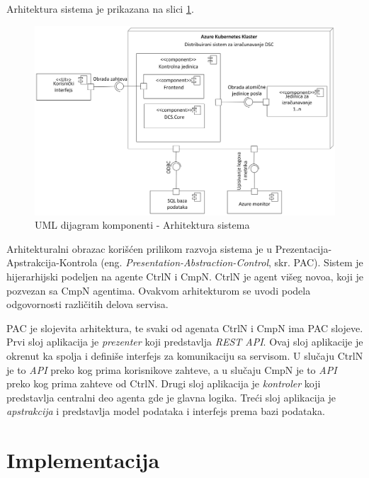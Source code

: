 \documentclass[12pt,oneside]{memoir}
\begin{document}
Arhitektura sistema je prikazana na slici \ref{fig:arhitektura}.

\begin{figure}[!ht]
  \centering
  \includegraphics[width=1.0\textwidth]{./images/arhitektura_sistema_dijagram_komponenti.png}
  \caption{UML dijagram komponenti - Arhitektura sistema}
  \label{fig:arhitektura}
\end{figure}

Arhitekturalni obrazac korišćen prilikom razvoja sistema je u Prezentacija-Apstrakcija-Kontrola (eng. \emph{Presentation-Abstraction-Control}, skr. PAC). Sistem je hijerarhijski podeljen na agente CtrlN i CmpN. CtrlN je agent višeg novoa, koji je pozvezan sa CmpN agentima. Ovakvom arhitekturom se uvodi podela odgovornosti različitih delova servisa.

PAC je slojevita arhitektura, te svaki od agenata CtrlN i CmpN ima PAC slojeve. Prvi sloj aplikacija je \emph{prezenter} koji predstavlja \emph{REST API}. Ovaj sloj aplikacije je okrenut ka spolja i definiše interfejs za komunikaciju sa servisom. U slučaju CtrlN je to \emph{API} preko kog prima korisnikove zahteve, a u slučaju CmpN je to \emph{API} preko kog prima zahteve od CtrlN. Drugi sloj aplikacija je \emph{kontroler} koji predstavlja centralni deo agenta gde je glavna logika. Treći sloj aplikacija je \emph{apstrakcija} i predstavlja model podataka i interfejs prema bazi podataka. 


\section{Implementacija}
\label{sec:implementacija}
\end{document}
